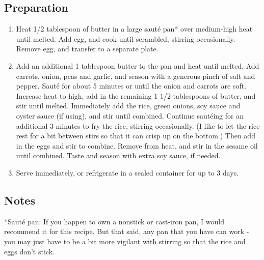 \subsection{Preparation}
\begin{enumerate}
  \item Heat 1/2 tablespoon of butter in a large saut\'{e} pan* over medium-high heat until melted. Add egg, and cook until scrambled, stirring occasionally. Remove egg, and transfer to a separate plate.
  \item Add an additional 1 tablespoon butter to the pan and heat until melted. Add carrots, onion, peas and garlic, and season with a generous pinch of salt and pepper. Saut\'{e} for about 5 minutes or until the onion and carrots are soft. Increase heat to high, add in the remaining 1 1/2 tablespoons of butter, and stir until melted. Immediately add the rice, green onions, soy sauce and oyster sauce (if using), and stir until combined. Continue saut\'{e}ing for an additional 3 minutes to fry the rice, stirring occasionally.  (I like to let the rice rest for a bit between stirs so that it can crisp up on the bottom.)  Then add in the eggs and stir to combine. Remove from heat, and stir in the sesame oil until combined.  Taste and season with extra soy sauce, if needed.
  \item Serve immediately, or refrigerate in a sealed container for up to 3 days.
\end{enumerate}

\subsection{Notes}
*Saut\'{e} pan: If you happen to own a nonstick or cast-iron pan, I would recommend it for this recipe.  But that said, any pan that you have can work - you may just have to be a bit more vigilant with stirring so that the rice and eggs don't stick.

